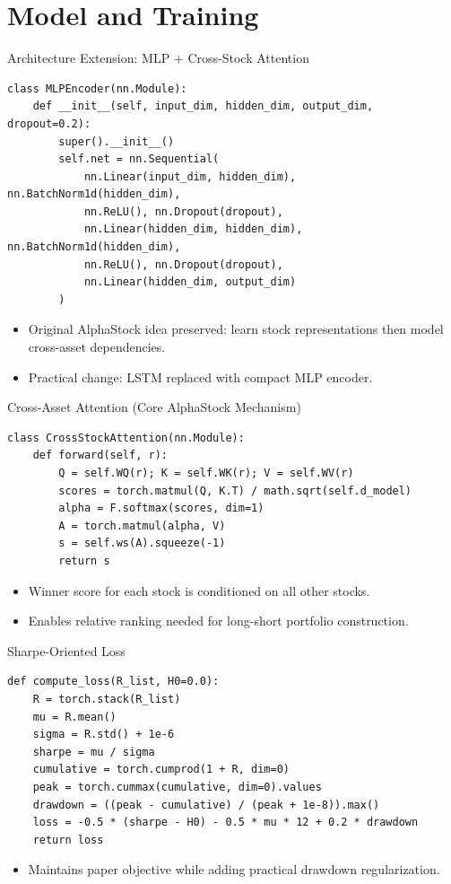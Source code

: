 \documentclass[aspectratio=169]{beamer}
\begin{document}
\section{Model and Training}
\begin{frame}[fragile]{Architecture Extension: MLP + Cross-Stock Attention}
\begin{lstlisting}[style=mypython]
class MLPEncoder(nn.Module):
    def __init__(self, input_dim, hidden_dim, output_dim, dropout=0.2):
        super().__init__()
        self.net = nn.Sequential(
            nn.Linear(input_dim, hidden_dim), nn.BatchNorm1d(hidden_dim),
            nn.ReLU(), nn.Dropout(dropout),
            nn.Linear(hidden_dim, hidden_dim), nn.BatchNorm1d(hidden_dim),
            nn.ReLU(), nn.Dropout(dropout),
            nn.Linear(hidden_dim, output_dim)
        )
\end{lstlisting}
\begin{itemize}
  \item Original AlphaStock idea preserved: learn stock representations then model cross-asset dependencies.
  \item Practical change: LSTM replaced with compact MLP encoder.
\end{itemize}
\end{frame}

\begin{frame}[fragile]{Cross-Asset Attention (Core AlphaStock Mechanism)}
\begin{lstlisting}[style=mypython]
class CrossStockAttention(nn.Module):
    def forward(self, r):
        Q = self.WQ(r); K = self.WK(r); V = self.WV(r)
        scores = torch.matmul(Q, K.T) / math.sqrt(self.d_model)
        alpha = F.softmax(scores, dim=1)
        A = torch.matmul(alpha, V)
        s = self.ws(A).squeeze(-1)
        return s
\end{lstlisting}
\begin{itemize}
  \item Winner score for each stock is conditioned on all other stocks.
  \item Enables relative ranking needed for long-short portfolio construction.
\end{itemize}
\end{frame}

\begin{frame}[fragile]{Sharpe-Oriented Loss}
\begin{lstlisting}[style=mypython]
def compute_loss(R_list, H0=0.0):
    R = torch.stack(R_list)
    mu = R.mean()
    sigma = R.std() + 1e-6
    sharpe = mu / sigma
    cumulative = torch.cumprod(1 + R, dim=0)
    peak = torch.cummax(cumulative, dim=0).values
    drawdown = ((peak - cumulative) / (peak + 1e-8)).max()
    loss = -0.5 * (sharpe - H0) - 0.5 * mu * 12 + 0.2 * drawdown
    return loss
\end{lstlisting}
\begin{itemize}
  \item Maintains paper objective while adding practical drawdown regularization.
\end{itemize}
\end{frame}
\end{document}
